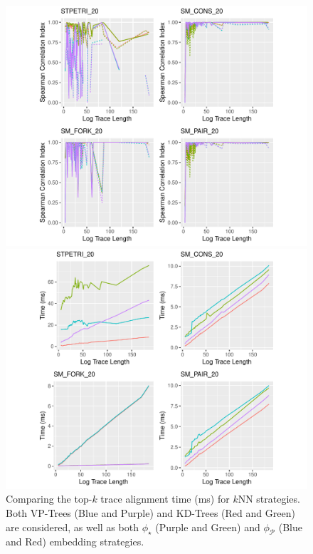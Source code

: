 \begin{figure}[!t]
\begin{minipage}{.49\textwidth}

	\includegraphics[width=1.1\textwidth]{images/Rplot04.pdf}
	\caption{Comparing appropriateness for different sub-embedding strategies for $\phi_{\mathcal{P}}$: $\color{ggplotGreen}\epsilon^1\&\nu^1$, $\color{ggplotRed}\epsilon^2\&\nu^1$, $\color{ggplotPurple}\epsilon^1\&\nu^2$, and $\color{ggplotBlue}\epsilon^2\&\nu^2$. Solid (dashed) lines refer to $k_{\phi_{\mathcal{P}}}$ ranking similarities considering controlled noise of $20\%$ ($30\%$).}\label{fig:app}
\end{minipage}\hfill \begin{minipage}{.49\textwidth}

	\includegraphics[width=1.1\textwidth]{images/kronos.pdf}
	\caption{Comparing the top-$k$ trace alignment time (ms) for $k$NN strategies. Both VP-Trees ({\color{ggplotBlue}Blue} and {\color{ggplotPurple}Purple}) and KD-Trees ({\color{ggplotRed}Red} and {\color{ggplotGreen}Green}) are considered, as well as both $\phi_\star$ ({\color{ggplotPurple}Purple} and {\color{ggplotGreen}Green}) and $\phi_{\mathcal{P}}$ ({\color{ggplotBlue}Blue} and {\color{ggplotRed}Red}) embedding strategies.}\label{fig:kronos}
\end{minipage}
\end{figure}
